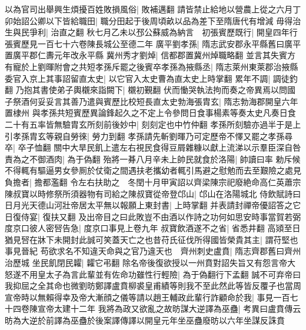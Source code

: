 以為官司出舉興生煩擾百姓敗損風俗|{
	敗補邁翻}
請皆禁止給地以營農上從之六月丁卯始詔公卿以下皆給職田|{
	職分田起于後周頃畝以品為差下至隋唐代有增減}
毋得治生與民爭利|{
	治直之翻}
秋七月乙未以邳公蘇威為納言　初張賓歷既行|{
	開皇四年行張賓歷見一百七十六卷陳長城公至德二年}
廣平劉孝孫|{
	隋志武安郡永平縣舊曰廣平置廣平郡仁夀元年改永平縣}
冀州秀才劉焯|{
	信都郡置冀州焯職略翻}
並言其失賓方有寵於上劉暉附會之共短孝孫斥罷之後賓卒孝孫為掖縣丞|{
	隋志萊州東萊郡治掖縣}
委官入京上其事詔留直太史|{
	以它官入太史曹為直太史上時掌翻}
累年不調|{
	調徒釣翻}
乃抱其書使弟子輿櫬來詣闕下|{
	櫬初覲翻}
伏而慟哭執法拘而奏之帝異焉以問國子祭酒何妥妥言其善乃遣與賓歷比校短長直太史勃海張胄玄|{
	隋志勃海郡開皇六年置棣州}
與孝孫共短賓歷異論鋒起久之不定上令參問日食事楊素等奏太史凡奏日食二十有五率皆無驗胄玄所刻前後妙中|{
	刻刻定也中竹仲翻}
孝孫所刻驗亦過半于是上引孝孫胄玄等親自勞徠|{
	勞力到翻}
孝孫請先斬劉暉乃可定歷帝不懌又罷之孝孫尋卒|{
	卒子恤翻}
關中大旱民飢上遣左右視民食得豆屑雜糠以獻上流涕以示羣臣深自咎責為之不御酒肉|{
	為于偽翻}
殆將一朞八月辛未上帥民就食於洛陽|{
	帥讀曰率}
勅斥候不得輒有驅逼男女參厠於仗衛之間遇扶老攜幼者輒引馬避之慰勉而去至艱險之處見負擔者|{
	擔都濫翻}
令左右扶助之　冬閏十月甲寅詔以齊梁陳宗祀廢絶命高仁英蕭宗陳叔寶以時修祭所須器物有司給之陳叔寶從帝登邙山|{
	邙山在洛陽城北}
侍飲賦詩曰日月光天德山河壯帝居太平無以報願上東封書|{
	上時掌翻}
并表請封禪帝優詔答之它日復侍宴|{
	復扶又翻}
及出帝目之曰此敗豈不由酒以作詩之功何如思安時事當賀若弼度京口彼人密唘告急|{
	度京口事見上卷九年}
叔寶飲酒遂不之省|{
	省悉井翻}
高熲至日猶見唘在牀下未開封此誠可笑蓋天亡之也昔苻氏征伐所得國皆榮貴其主|{
	謂苻堅也事見晉紀}
苟欲求名不知違天命與之官乃違天也　齊州刺史盧賁|{
	隋志齊郡舊曰齊州治歷城}
坐民飢閉民糶|{
	糶它弔翻}
除名帝後復欲授以一州賁對詔失旨又有怨言帝大怒遂不用皇太子為言此輩並有佐命功雖性行輕險|{
	為于偽翻行下孟翻}
誠不可弃帝曰我抑屈之全其命也微劉昉鄭譯盧賁柳裘皇甫績等則我不至此然此等皆反覆子也當周宣帝時以無賴得幸及帝大漸顔之儀等請以趙王輔政此輩行詐顧命於我|{
	事見一百七十四卷陳宣帝太建十二年}
我將為政又欲亂之故昉謀大逆譯為巫蠱|{
	考異曰盧賁傳云昉為大逆於前譯為巫蠱於後案譯傳譯以開皇元年坐巫蠱廢昉以六年坐謀反誅賁}


